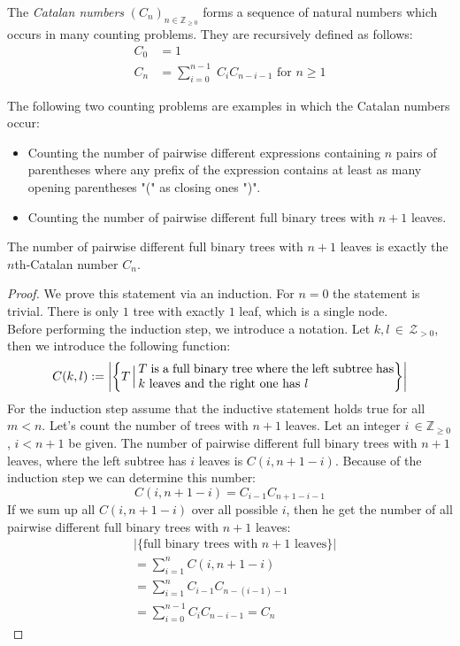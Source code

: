 \begin{defin}
The \textit{Catalan numbers} $(C_n)_{n \in \mathbb{Z}_{\geq 0}}$ forms a sequence of natural numbers which occurs in many counting problems. They are recursively defined as follows:
\begin{align*}
C_0 &= 1 \\
C_n &= \sum_{i=0}^{n-1} \; C_i C_{n-i-1} \text{ for } n \geq 1 
\end{align*}
\end{defin}
\begin{rem}
The following two counting problems are examples in which the Catalan numbers occur:
\begin{itemize}
\item Counting the number of pairwise different expressions containing $n$ pairs of parentheses where any prefix of the expression contains at least as many opening parentheses "(" as closing ones ")".~\cite{Ste}
\item Counting the number of pairwise different full binary trees with $n+1$ leaves. 
\end{itemize}
\end{rem}
\begin{lem}\label{lem:binCat}
The number of pairwise different full binary trees with $n+1$ leaves is exactly the $n$th-Catalan number $C_n$.
\end{lem}
\begin{proof}
We prove this statement via an induction. For $n=0$ the statement is trivial. There is only $1$ tree with exactly $1$ leaf, which is a single node.\\
Before performing the induction step, we introduce a notation. Let $k,l \, \in \, \mathcal{Z}_{> 0}$, then we introduce the following function:
$$C(k,l) := \bigg| \bigg\{T\, \Big| \, \parbox[position]{0.6\textwidth}{$T$ is a full binary tree where the left subtree has $k$ leaves and the right one has $l$}\bigg\}\bigg|$$ 
For the induction step assume that the inductive statement holds true for all $m < n$. Let's count the number of trees with $n+1$ leaves. Let an integer $i \, \in \mathbb{Z}_{\geq 0}$, $i < n+1$ be given. The number of pairwise different full binary trees with $n+1$ leaves, where the left subtree has $i$ leaves is $C(i, n+1-i)$. Because of the induction step we can determine this number:
$$C(i,n+1-i)= C_{i-1}C_{n+1-i-1}$$
If we sum up all $C(i,n+1-i)$ over all possible $i$, then he get the number of all pairwise different full binary trees with $n+1$ leaves:
\begin{align*}
&|\{\text{full binary trees with $n+1$ leaves}\}| \\
&= \sum_{i=1}^{n} C(i, n+1-i) \\
&= \sum_{i=1}^{n} C_{i-1}C_{n-(i-1)-1} \\
&= \sum_{i=0}^{n-1} C_{i}C_{n-i-1} = C_n
\end{align*}
\end{proof}
